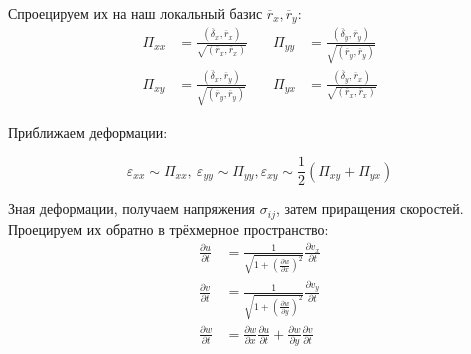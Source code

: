 \documentclass[12pt,a4paper,fleqn]{article}
\begin{document}
Спроецируем их на наш локальный базис $\overline{r}_x, \overline{r}_y$:
\begin{align}
	\Pi_{xx} &= \frac{(\overline{\delta}_x, \overline{r}_x)}{\sqrt{(\overline{r}_x, \overline{r}_x)}} &\quad 
		\Pi_{yy} &= \frac{(\overline{\delta}_y, \overline{r}_y)}{\sqrt{(\overline{r}_y, \overline{r}_y)}} \\
	\Pi_{xy} &= \frac{(\overline{\delta}_x, \overline{r}_y)}{\sqrt{(\overline{r}_y, \overline{r}_y)}} &\quad 
		\Pi_{yx} &= \frac{(\overline{\delta}_y, \overline{r}_x)}{\sqrt{(\overline{r}_x, \overline{r}_x)}} 
\end{align}

Приближаем деформации:

\begin{equation}
	\varepsilon_{xx} \sim \Pi_{xx},\ \varepsilon_{yy} \sim \Pi_{yy}, 
		\varepsilon_{xy} \sim \frac{1}{2}(\Pi_{xy} + \Pi_{yx})
\end{equation}

Зная деформации, получаем напряжения $\sigma_{ij}$, затем приращения скоростей. Проецируем их обратно в трёхмерное пространство:
\begin{align}
	\frac{\partial u}{\partial t} &= \frac{1}{\sqrt{1 + \left( \frac{\partial w}{\partial x} \right)^2 }} \frac{\partial v_x}{\partial t} \\
	\frac{\partial v}{\partial t} &= \frac{1}{\sqrt{1 + \left( \frac{\partial w}{\partial y} \right)^2 }} \frac{\partial v_y}{\partial t} \\
	\frac{\partial w}{\partial t} &= \frac{\partial w}{\partial x} \frac{\partial u}{\partial t} 
			+ \frac{\partial w}{\partial y} \frac{\partial v}{\partial t}
\end{align}
 
\end{document}

